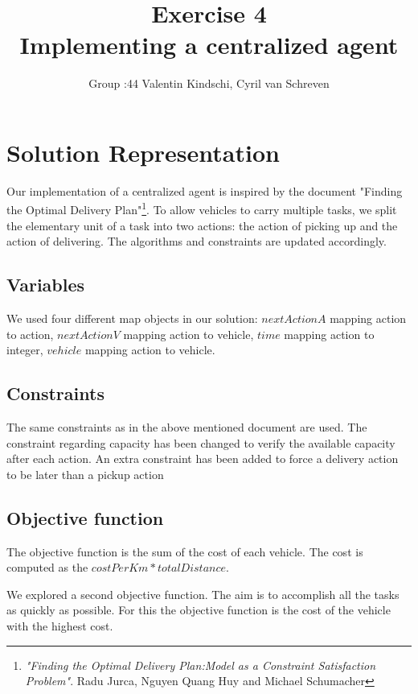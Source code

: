 \documentclass[11pt]{article}
\title{\bf Exercise 4\\ Implementing a centralized agent}
\author{Group \textnumero:44 Valentin Kindschi, Cyril van Schreven}
\begin{document}
\maketitle

\section{Solution Representation}

Our implementation of a centralized agent is inspired by the document "Finding the Optimal Delivery Plan"\footnote{\textit{"Finding the Optimal Delivery Plan:Model as a Constraint Satisfaction Problem"}. Radu Jurca, Nguyen Quang Huy and Michael Schumacher}. To allow vehicles to carry multiple tasks, we split the elementary unit of a task into two actions: the action of picking up and the action of delivering. The algorithms and constraints are updated accordingly.

\subsection{Variables}
We used four different map objects in our solution: $nextActionA$ mapping action to action, $nextActionV$ mapping action to vehicle, $time$ mapping action to integer, $vehicle$ mapping action to vehicle.

\subsection{Constraints}
The same constraints as in the above mentioned document are used. The constraint regarding capacity has been changed to verify the available capacity after each action. An extra constraint has been added to force a delivery action to be later than a pickup action


\subsection{Objective function}
The objective function is the sum of the cost of each vehicle. The cost is computed as the $costPerKm*totalDistance$.

We explored a second objective function. The aim is to accomplish all the tasks as quickly as possible. For this the objective function is the cost of the vehicle with the highest cost.
\end{document}
